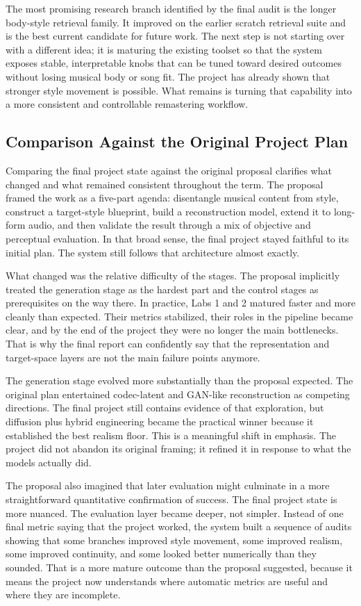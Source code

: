 \documentclass[conference]{IEEEtran}
\begin{document}
The most promising research branch identified by the final audit is the longer body-style retrieval family. It improved on the earlier scratch retrieval suite and is the best current candidate for future work. The next step is not starting over with a different idea; it is maturing the existing toolset so that the system exposes stable, interpretable knobs that can be tuned toward desired outcomes without losing musical body or song fit. The project has already shown that stronger style movement is possible. What remains is turning that capability into a more consistent and controllable remastering workflow.

\subsection{Comparison Against the Original Project Plan}
Comparing the final project state against the original proposal clarifies what changed and what remained consistent throughout the term. The proposal framed the work as a five-part agenda: disentangle musical content from style, construct a target-style blueprint, build a reconstruction model, extend it to long-form audio, and then validate the result through a mix of objective and perceptual evaluation. In that broad sense, the final project stayed faithful to its initial plan. The system still follows that architecture almost exactly.

What changed was the relative difficulty of the stages. The proposal implicitly treated the generation stage as the hardest part and the control stages as prerequisites on the way there. In practice, Labs 1 and 2 matured faster and more cleanly than expected. Their metrics stabilized, their roles in the pipeline became clear, and by the end of the project they were no longer the main bottlenecks. That is why the final report can confidently say that the representation and target-space layers are not the main failure points anymore.

The generation stage evolved more substantially than the proposal expected. The original plan entertained codec-latent and GAN-like reconstruction as competing directions. The final project still contains evidence of that exploration, but diffusion plus hybrid engineering became the practical winner because it established the best realism floor. This is a meaningful shift in emphasis. The project did not abandon its original framing; it refined it in response to what the models actually did.

The proposal also imagined that later evaluation might culminate in a more straightforward quantitative confirmation of success. The final project state is more nuanced. The evaluation layer became deeper, not simpler. Instead of one final metric saying that the project worked, the system built a sequence of audits showing that some branches improved style movement, some improved realism, some improved continuity, and some looked better numerically than they sounded. That is a more mature outcome than the proposal suggested, because it means the project now understands where automatic metrics are useful and where they are incomplete.
\end{document}
